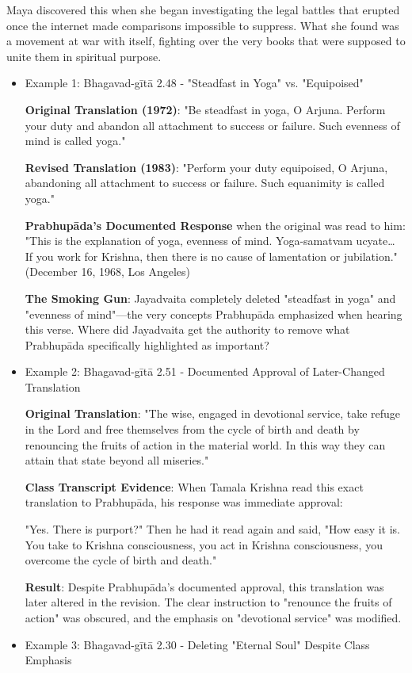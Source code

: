 \documentclass[11pt,twoside]{book}
\begin{document}
Maya discovered this when she began investigating the legal battles that erupted once the internet made comparisons impossible to suppress. What she found was a movement at war with itself, fighting over the very books that were supposed to unite them in spiritual purpose.
\begin{itemize}
\item Example 1: Bhagavad-gītā 2.48 - "Steadfast in Yoga" vs. "Equipoised"
\label{sec:orge324d6d}

\textbf{\textbf{Original Translation (1972)}}: "Be steadfast in yoga, O Arjuna. Perform your duty and abandon all attachment to success or failure. Such evenness of mind is called yoga."

\textbf{\textbf{Revised Translation (1983)}}: "Perform your duty equipoised, O Arjuna, abandoning all attachment to success or failure. Such equanimity is called yoga."

\textbf{\textbf{Prabhupāda's Documented Response}} when the original was read to him:
"This is the explanation of yoga, evenness of mind. Yoga-samatvam ucyate\ldots{} If you work for Krishna, then there is no cause of lamentation or jubilation." (December 16, 1968, Los Angeles)

\textbf{\textbf{The Smoking Gun}}: Jayadvaita completely deleted "steadfast in yoga" and "evenness of mind"—the very concepts Prabhupāda emphasized when hearing this verse. Where did Jayadvaita get the authority to remove what Prabhupāda specifically highlighted as important?
\item Example 2: Bhagavad-gītā 2.51 - Documented Approval of Later-Changed Translation
\label{sec:orge3afdbe}

\textbf{\textbf{Original Translation}}: "The wise, engaged in devotional service, take refuge in the Lord and free themselves from the cycle of birth and death by renouncing the fruits of action in the material world. In this way they can attain that state beyond all miseries."

\textbf{\textbf{Class Transcript Evidence}}: When Tamala Krishna read this exact translation to Prabhupāda, his response was immediate approval:

"Yes. There is purport?" Then he had it read again and said, "How easy it is. You take to Krishna consciousness, you act in Krishna consciousness, you overcome the cycle of birth and death." 

\textbf{\textbf{Result}}: Despite Prabhupāda's documented approval, this translation was later altered in the revision. The clear instruction to "renounce the fruits of action" was obscured, and the emphasis on "devotional service" was modified.
\item Example 3: Bhagavad-gītā 2.30 - Deleting "Eternal Soul" Despite Class Emphasis
\label{sec:orgf6129d3}


\end{itemize}
\end{document}
